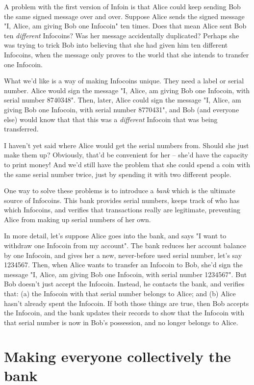 \documentclass[12pt]{book}
\newcounter{problem}[chapter]
\begin{document}
A problem with the first version of Infoin is that Alice could keep
sending Bob the same signed message over and over.  Suppose Alice
sends the signed message "I, Alice, am giving Bob one Infocoin" ten
times.  Does that mean Alice sent Bob ten \emph{different} Infocoins?
Was her message accidentally duplicated?  Perhaps she was trying to
trick Bob into believing that she had given him ten different
Infocoins, when the message only proves to the world that she intends
to transfer one Infocoin.

What we'd like is a way of making Infocoins unique.  They need a label
or serial number.  Alice would sign the message "I, Alice, am giving
Bob one Infocoin, with serial number 8740348".  Then, later, Alice
could sign the message "I, Alice, am giving Bob one Infocoin, with
serial number 8770431", and Bob (and everyone else) would know that
that this was a \emph{different} Infocoin that was being transferred.

I haven't yet said where Alice would get the serial numbers from.
Should she just make them up?  Obviously, that'd be convenient for her
-- she'd have the capacity to print money!  And we'd still have the
problem that she could spend a coin with the same serial number twice,
just by spending it with two different people.

One way to solve these problems is to introduce a \emph{bank} which is
the ultimate source of Infocoins.  This bank provides serial numbers,
keeps track of who has which Infocoins, and verifies that transactions
really are legitimate, preventing Alice from making up serial numbers
of her own.

In more detail, let's suppose Alice goes into the bank, and says "I
want to withdraw one Infocoin from my account".  The bank reduces her
account balance by one Infocoin, and gives her a new, never-before
used serial number, let's say 1234567.  Then, when Alice wants to
transfer an Infocoin to Bob, she'd sign the message "I, Alice, am
giving Bob one Infocoin, with serial number 1234567".  But Bob doesn't
just accept the Infocoin.  Instead, he contacts the bank, and verifies
that: (a) the Infocoin with that serial number belongs to Alice; and
(b) Alice hasn't already spent the Infocoin.  If both those things are
true, then Bob accepts the Infocoin, and the bank updates their
records to show that the Infocoin with that serial number is now in
Bob's possession, and no longer belongs to Alice.

\section{Making everyone collectively the bank}
\end{document}
